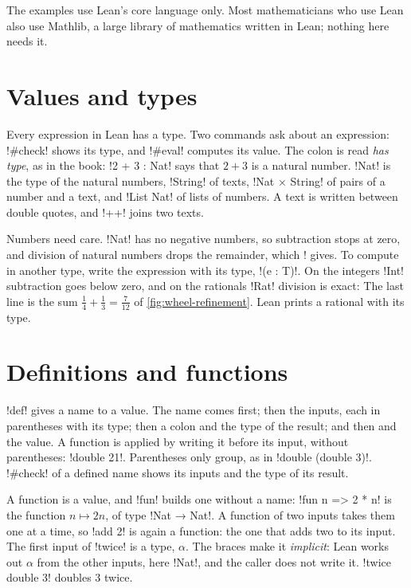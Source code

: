 The examples use Lean's core language only. Most mathematicians who use Lean
also use Mathlib, a large library of mathematics written in Lean; nothing
here needs it.

\section*{Values and types}

Every expression in Lean has a type. Two commands ask about an expression:
\li!#check! shows its type, and \li!#eval! computes its value.
The colon is read \emph{has type}, as in the book: \li!2 + 3 : Nat! says that
$2+3$ is a natural number. \li!Nat! is the type of the natural numbers,
\li!String! of texts, \li!Nat × String! of pairs of a number and a text, and
\li!List Nat! of lists of numbers. A text is written between double quotes,
and \li!++! joins two texts.

Numbers need care. \li!Nat! has no negative numbers, so subtraction stops at
zero, and division of natural numbers drops the remainder, which \li!%
gives. To compute in another type, write the expression with its type,
\li!(e : T)!. On the integers \li!Int! subtraction goes below zero, and on
the rationals \li!Rat! division is exact:
The last line is the sum $\frac14+\frac13=\frac7{12}$ of
\cref{fig:wheel-refinement}. Lean prints a rational with its type.

\section*{Definitions and functions}

\li!def! gives a name to a value. The name comes first; then the inputs, each
in parentheses with its type; then a colon and the type of the result; and
then \lc{:=} and the value.
A function is applied by writing it before its input, without parentheses:
\li!double 21!. Parentheses only group, as in \li!double (double 3)!.
\li!#check! of a defined name shows its inputs and the type of its result.

A function is a value, and \li!fun! builds one without a name:
\li!fun n => 2 * n! is the function $n\mapsto2n$, of type \li!Nat → Nat!. A
function of two inputs takes them one at a time, so \li!add 2! is again a
function: the one that adds two to its input.
The first input of \li!twice! is a type, $\alpha$. The braces make it
\emph{implicit}: Lean works out $\alpha$ from the other inputs, here
\li!Nat!, and the caller does not write it. \li!twice double 3! doubles $3$
twice.

